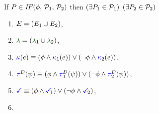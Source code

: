 \begin{figure}
  \noindent
  If $\aPS \in \sIF{\aForm}\sTHEN\aPSS_1\sELSE\aPSS_2\sFI$ then
  $(\exists P_1\in\mathcal{P}_1)$ $(\exists P_2\in\mathcal{P}_2)$
  \begin{multicols}{2}
    \begin{enumerate}[topsep=0pt,label=(\textsc{i}\arabic*),ref=\textsc{i}\arabic*]
    \item \label{if-E}
      $E = (E_1\cup E_2)$,
    \item \label{if-lambda}
      ${\labeling}=\PBR{{\labeling_1}\cup {\labeling_2}}$, 
    \item \label{if-kappa}
      ${\color{blue}\kappa}(e) \mathrel{\equiv} (\phi\land{\color{blue}\kappa}_1(e))\lor(\neg\phi\land{\color{blue}\kappa}_2(e))$,
    \item \label{if-tau}
      $\aTr{\bEvs}{\bForm} \riff (\aForm\land\aTr[1]{\bEvs}{\bForm})\lor(\neg\aForm\land\aTr[2]{\bEvs}{\bForm})$,
    \item \label{if-term}
      $\aTerm \riff (\aForm\land\aTerm[1])\lor(\neg\aForm\land\aTerm[2])$,
    \item \label{if-le}

\end{enumerate}
\end{multicols}
\end{figure}
